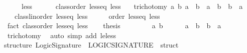 \begin{isabellebody}
\ \ \ \ \ less\ {\isacharparenleft}{\kern0pt}\ {\isachardoublequoteopen}\isactrlbold {\isacharless}{\kern0pt}{\isachardoublequoteclose}\ {}{}{\isacharparenright}{\kern0pt}\isanewline
\ \ \ {\isachardoublequoteopen}class{\isachardot}{\kern0pt}order\ less{\isacharunderscore}{\kern0pt}eq\ less{\isachardoublequoteclose}\isanewline
\ \ \ trichotomy{\isacharcolon}{\kern0pt}\ {\isachardoublequoteopen}{\isasymAnd}a\ b{\isachardot}{\kern0pt}\ a\ \isactrlbold {\isacharless}{\kern0pt}\ b\ {\isasymor}\ a\ {\isacharequal}{\kern0pt}\ b\ {\isasymor}\ b\ \isactrlbold {\isacharless}{\kern0pt}\ a{\isachardoublequoteclose}\isanewline
\ \ \ {\isachardoublequoteopen}class{\isachardot}{\kern0pt}linorder\ less{\isacharunderscore}{\kern0pt}eq\ less{\isachardoublequoteclose}\isanewline
%
\isadelimproof
%
\endisadelimproof
%
\isatagproof
{}\isamarkupfalse%
\ {\isacharminus}{\kern0pt}\isanewline
\ \ \isamarkupfalse%
\ order\ less{\isacharunderscore}{\kern0pt}eq\ less\isanewline
\ \ \ \ \isamarkupfalse%
\ {\isacharparenleft}{\kern0pt}fact\ {\isacartoucheopen}class{\isachardot}{\kern0pt}order\ less{\isacharunderscore}{\kern0pt}eq\ less{\isacartoucheclose}{\isacharparenright}{\kern0pt}\isanewline
\ \ \isamarkupfalse%
\ {\isacharquery}{\kern0pt}thesis\isanewline
\ \ \isamarkupfalse%
\isanewline
\ \ \ \ \isamarkupfalse%
\ a\ b\isanewline
\ \ \ \ \isamarkupfalse%
\ {\isachardoublequoteopen}a\ \isactrlbold {\isasymle}\ b\ {\isasymor}\ b\ \isactrlbold {\isasymle}\ a{\isachardoublequoteclose}\isanewline
\ \ \ \ \ \ \isamarkupfalse%
\ trichotomy\ \isamarkupfalse%
\ {\isacharparenleft}{\kern0pt}auto\ simp\ add{\isacharcolon}{\kern0pt}\ le{\isacharunderscore}{\kern0pt}less{\isacharparenright}{\kern0pt}\isanewline
\ \ \isamarkupfalse%
\isanewline
{}\isamarkupfalse%
%
\endisatagproof
{\isafoldproof}%
%
\isadelimproof
%
\endisadelimproof
%
\isadelimdocument
%
\endisadelimdocument
%
\isatagdocument
%
\isamarkuptrue%
%
\endisatagdocument
{\isafolddocument}%
%
\isadelimdocument
%
\endisadelimdocument
%
\isadelimML
%
\endisadelimML
%
\isatagML
{}\isamarkupfalse%
\ {\isacartoucheopen}\isanewline
structure\ Logic{\isacharunderscore}{\kern0pt}Signature\ {\isacharcolon}{\kern0pt}\ LOGIC{\isacharunderscore}{\kern0pt}SIGNATURE\ {\isacharequal}{\kern0pt}\ struct\isanewline

\end{isabellebody}
